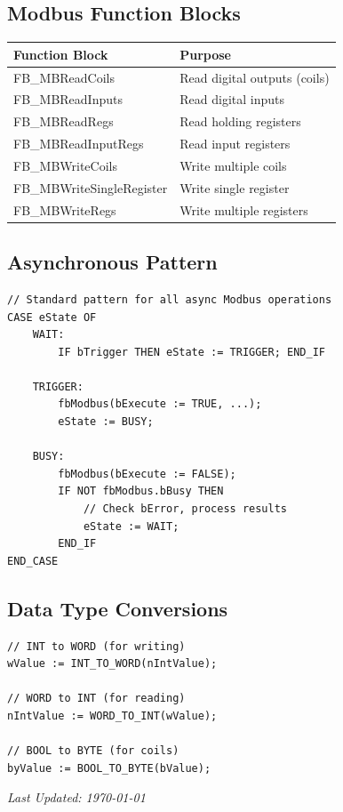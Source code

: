 \documentclass[11pt,a4paper]{article}
\begin{document}
\subsection*{Modbus Function Blocks}

\begin{table}[h]
\centering
\begin{tabular}{@{}ll@{}}
\toprule
\textbf{Function Block} & \textbf{Purpose} \\
\midrule
FB\_MBReadCoils & Read digital outputs (coils) \\
FB\_MBReadInputs & Read digital inputs \\
FB\_MBReadRegs & Read holding registers \\
FB\_MBReadInputRegs & Read input registers \\
FB\_MBWriteCoils & Write multiple coils \\
FB\_MBWriteSingleRegister & Write single register \\
FB\_MBWriteRegs & Write multiple registers \\
\bottomrule
\end{tabular}
\end{table}

\subsection*{Asynchronous Pattern}

\begin{lstlisting}
// Standard pattern for all async Modbus operations
CASE eState OF
    WAIT:
        IF bTrigger THEN eState := TRIGGER; END_IF
        
    TRIGGER:
        fbModbus(bExecute := TRUE, ...);
        eState := BUSY;
        
    BUSY:
        fbModbus(bExecute := FALSE);
        IF NOT fbModbus.bBusy THEN
            // Check bError, process results
            eState := WAIT;
        END_IF
END_CASE
\end{lstlisting}

\subsection*{Data Type Conversions}

\begin{lstlisting}
// INT to WORD (for writing)
wValue := INT_TO_WORD(nIntValue);

// WORD to INT (for reading)
nIntValue := WORD_TO_INT(wValue);

// BOOL to BYTE (for coils)
byValue := BOOL_TO_BYTE(bValue);
\end{lstlisting}

\vfill

\begin{center}
\textit{Last Updated: \today}
\end{center}
\end{document}
